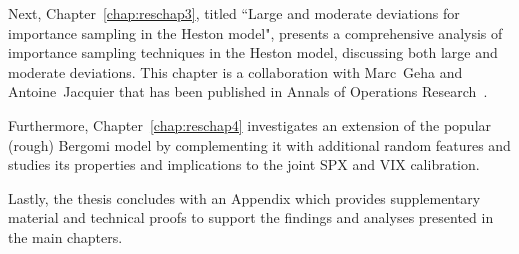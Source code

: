 Next, Chapter~\ref{chap:reschap3}, titled ``Large and moderate deviations for importance sampling in the Heston model", presents a comprehensive analysis of importance sampling techniques in the Heston model, discussing both large and moderate deviations. This chapter is a collaboration with Marc~Geha and Antoine~Jacquier that has been published in Annals of Operations Research~\cite{Geha2023LargeModel}.

Furthermore, Chapter~\ref{chap:reschap4} investigates an extension of the popular (rough) Bergomi model by complementing it with additional random features and studies its
properties and implications to the joint SPX and VIX calibration. 

Lastly, the thesis concludes with an Appendix which provides supplementary material and technical proofs to support the findings and analyses presented in the main chapters.
